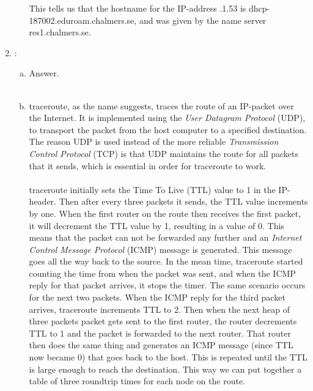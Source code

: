 \documentclass[a4paper,9pt,fleqn]{article}
\begin{document}
\begin{enumerate}[{Task} 1]
\begin{enumerate}[a)]
This tells us that the hostname for the IP-address {.1.53} is
{\outp dhcp-187002.eduroam.chalmers.se}, and was given by the name server
{\outp res1.chalmers.se}.
\end{enumerate}

\item :
\begin{enumerate}[a)]
\item 
Answer.  
\\
\\
\item 
{\outp traceroute}, as the name suggests, traces the route of an IP-packet over
the Internet. It is implemented using the {\it User Datagram Protocol} (UDP),
to transport the packet from the host computer to a specified destination.
The reason UDP is used instead of the more reliable {\it Transmission Control
Protocol} (TCP) is that UDP maintains the route for all packets that it
sends, which is essential in order for {\outp traceroute} to work.
\\
\\
{\outp traceroute} initially sets the {\outp Time To Live} ({\outp TTL}) value
to 1 in the IP-header. Then after every three packets it sends, the {\outp TTL} value
increments by one. When the first router on the route then receives the first packet,
it will decrement the {\outp TTL} value by 1, resulting in a value of 0. This means that
the packet can not be forwarded any further and an {\it Internet Control Message Protocol}
(ICMP) message is generated. This message goes all the way back to the
source. In the mean time, {\outp traceroute} started counting the time from
when the packet was sent, and when the ICMP reply for that packet arrives, it stops the
timer. The same scenario occurs for the next two packets. When the ICMP reply for
the third packet arrives, {\outp traceroute} increments {\outp TTL} to 2. Then when the
next heap of three packets packet gets sent to the first router, the router decrements
{\outp TTL} to 1 and the packet is forwarded to the next router. That router then does the
same thing and generates an ICMP message (since {\outp TTL} now became 0) that goes back
to the host. This is repeated until the {\outp TTL} is large enough to reach the destination.
This way we can put together a table of three roundtrip times for each node on the route.
\end{enumerate}


\end{enumerate}
\end{document}
